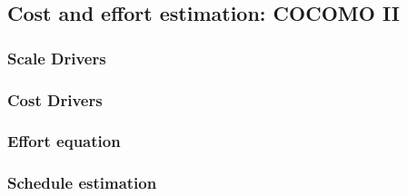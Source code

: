 \subsection{Cost and effort estimation: COCOMO II}

\subsubsection{Scale Drivers}

\subsubsection{Cost Drivers}

\subsubsection{Effort equation}

\subsubsection{Schedule estimation}
